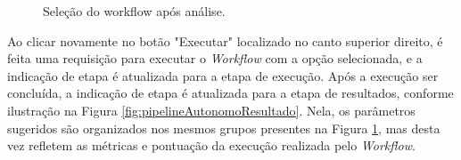 \documentclass[portugues]{ic-tese}
\begin{document}
\begin{figure}[H]
    \centering
    \caption{Seleção do workflow após análise.}
    \label{fig:pipelineAutonomoSelecao}
\end{figure}

Ao clicar novamente no botão "Executar" localizado no canto superior direito, é feita uma requisição para executar o \textit{Workflow} com a opção selecionada, e a indicação de etapa é atualizada para a etapa de execução. Após a execução ser concluída,  a indicação de etapa é atualizada para a etapa de resultados, conforme ilustração na Figura \ref{fig:pipelineAutonomoResultado}. Nela, os parâmetros sugeridos são organizados nos mesmos grupos presentes na Figura \ref{fig:pipelineAutonomoSelecao}, mas desta vez refletem as métricas e pontuação da execução realizada pelo \textit{Workflow}.
\end{document}

